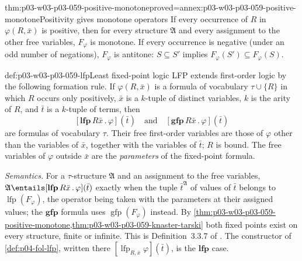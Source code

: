 \begin{hblemma}{thm:p03-w03-p03-059-positive-monotone}{proved=annex:p03-w03-p03-059-positive-monotone}{Positivity gives monotone operators}
If every occurrence of \(R\) in \(\varphi(R,\bar x)\) is positive, then for
every structure \(\mathfrak A\) and every assignment to the other free
variables, \(F_\varphi\) is monotone. If every occurrence is negative
(under an odd number of negations), \(F_\varphi\) is antitone:
\(S\subseteq S'\) implies \(F_\varphi(S')\subseteq F_\varphi(S)\).
\end{hblemma}

\begin{hbdefinition}{def:p03-w03-p03-059-lfp}{Least fixed-point logic}
LFP extends first-order logic by the following formation rule. If
\(\varphi(R,\bar x)\) is a formula of vocabulary \(\tau\cup\{R\}\) in which
\(R\) occurs only positively, \(\bar x\) is a \(k\)-tuple of distinct
variables, \(k\) is the arity of \(R\), and \(\bar t\) is a \(k\)-tuple of
terms, then
\[
 [\mathbf{lfp}\,R\bar x\,.\,\varphi](\bar t)
 \quad\text{and}\quad
 [\mathbf{gfp}\,R\bar x\,.\,\varphi](\bar t)
\]
are formulas of vocabulary \(\tau\). Their free first-order variables are
those of \(\varphi\) other than the variables of \(\bar x\), together with
the variables of \(\bar t\); \(R\) is bound. The free variables of
\(\varphi\) outside \(\bar x\) are the \emph{parameters} of the fixed-point
formula.

\emph{Semantics.} For a \(\tau\)-structure \(\mathfrak A\) and an
assignment to the free variables,
\(\mathfrak A\entails[\mathbf{lfp}\,R\bar x\,.\,\varphi](\bar t)\) exactly
when the tuple \(\bar t^{\mathfrak A}\) of values of \(\bar t\) belongs to
\(\operatorname{lfp}(F_\varphi)\), the operator being taken with the
parameters at their assigned values; the \(\mathbf{gfp}\) formula uses
\(\operatorname{gfp}(F_\varphi)\) instead. By
\cref{thm:p03-w03-p03-059-positive-monotone,thm:p03-w03-p03-059-knaster-tarski}
both fixed points exist on every structure, finite or infinite. This is
Definition~3.3.7 of \cite[p.~155]{Gradel2007FMTDescriptiveChapter}. The constructor of
\cref{def:p04-fol-lfp}, written there
\([\operatorname{lfp}_{R,\bar x}\varphi](\bar t)\), is the
\(\mathbf{lfp}\) case.
\end{hbdefinition}

